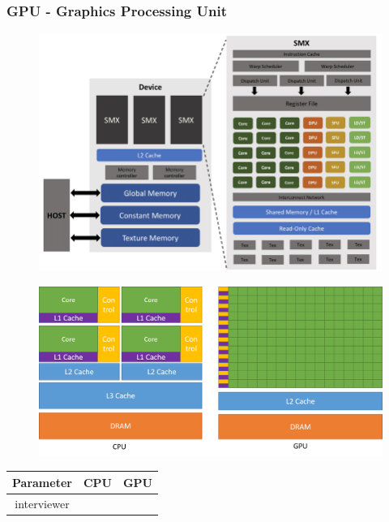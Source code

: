 \documentclass[xcolor=x11names,table]{beamer}
\begin{document}
	\begin{frame}[allowframebreaks]
		\frametitle{GPU - Graphics Processing Unit}
		\begin{figure}[!h]
			\centering
			\includegraphics[width=\linewidth,height=\dimexpr\textheight-2\baselineskip-\abovecaptionskip-\belowcaptionskip\relax,keepaspectratio]{refs/Typical-NVIDIA-GPU-architecture-The-number-of-SMXs-and-the-computation-resources-inside.png}
			\label{fig:gpu-architecture}
		\end{figure}
	
		\begin{figure}[!h]
			\centering
			\includegraphics[width=\linewidth,height=\dimexpr\textheight-2\baselineskip-\abovecaptionskip-\belowcaptionskip\relax,keepaspectratio]{refs/gpu-devotes-more-transistors-to-data-processing.png}
			\label{fig:cpu-gpu-architecture}
		\end{figure}
	
	    \begin{tabular}{|c|c|c|} \hline
				Parameter & CPU & GPU  \\ \hline
				interviewer
		\end{tabular}
	\end{frame}
\end{document}
